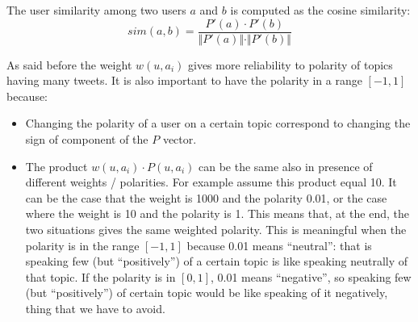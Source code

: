\documentclass[a4paper,11pt,oneside]{article}
\begin{document}
The user similarity among two users $a$ and $b$ is computed as the cosine similarity:
\begin{equation}
sim(a,b) = \frac{P'(a) \cdot P'(b)}{\Vert P'(a)\Vert \cdot \Vert P'(b) \Vert} 
\end{equation}

As said before the weight $w(u,a_i)$ gives more reliability to polarity of topics having many tweets. It is also important to have the polarity in a range $[-1,1]$ because:

\begin{itemize}
\item Changing the polarity of a user on a certain topic correspond to changing the sign of component of the $P$ vector.
\item The product $w(u,a_i) \cdot P(u,a_i)$ can be the same also in presence of different weights / polarities. For example assume this product equal 10. It can be the case that the weight is 1000 and the polarity 0.01, or the case where the weight is 10 and the polarity is 1.
This means that, at the end, the two situations gives the same weighted polarity. This is meaningful when the polarity is in the range $[-1,1]$ because 0.01 means ``neutral'': that is speaking few (but ``positively'') of a certain topic is like speaking neutrally of that topic.
If the polarity is in $[0,1]$, 0.01 means ``negative'', so speaking few (but ``positively'') of certain topic would be like speaking of it negatively, thing that we have to avoid.
\end{itemize}



\end{document}
